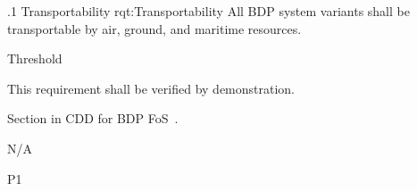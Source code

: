 
\ONERQMTVKSA
{\RqtNumberBase.1}
{Transportability}
{rqt:Transportability}
{All BDP system variants shall be transportable by air, ground, and maritime resources.}
{
	\item [Phase 1] Threshold
}
{This requirement shall be verified by demonstration.}
{
\item [5.5.7.1] Section in CDD for BDP FoS~\cite{ref__BDP_FOS_CDD}.
}
{
	\item N/A
}
{P1}

